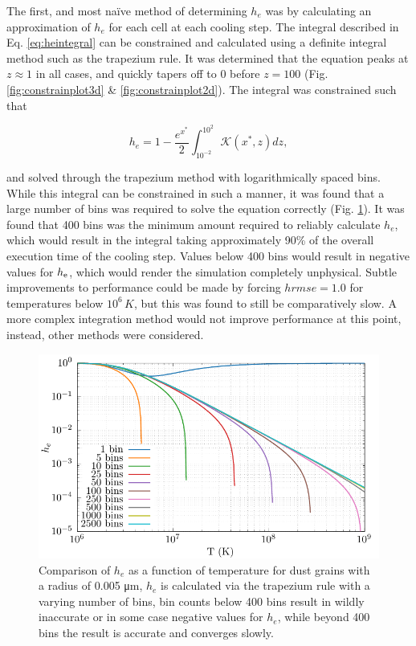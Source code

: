 The first, and most na\"ive method of determining $h_e$ was by calculating an approximation of $h_e$ for each cell at each cooling step.
The integral described in Eq. \ref{eq:heintegral} can be constrained and calculated using a definite integral method such as the trapezium rule.
It was determined that the equation peaks at $z \approx 1$ in all cases, and quickly tapers off to $0$ before $z=100$ (Fig. \ref{fig:constrainplot3d} \& \ref{fig:constrainplot2d}).
The integral was constrained such that

\begin{equation}
  h_e = 1 - \frac{e^{x^*}}{2} \int^{10^2}_{10^{-2}} \mathcal{K}(x^*,z) dz,
\end{equation}

\noindent
and solved through the trapezium method with logarithmically spaced bins.
While this integral can be constrained in such a manner, it was found that a large number of bins was required to solve the equation correctly (Fig. \ref{fig:he-accuracy-bins}).
It was found that 400 bins was the minimum amount required to reliably calculate $h_e$, which would result in the integral taking approximately 90\% of the overall execution time of the cooling step.
Values below 400 bins would result in negative values for $h_\text{e}$, which would render the simulation completely unphysical.
Subtle improvements to performance could be made by forcing $h
rms{e} = 1.0$ for temperatures below $10^6 \, \si{K}$, but this was found to still be comparatively slow.
A more complex integration method would not improve performance at this point, instead, other methods were considered.

\begin{figure}[ht]
  \centering
  \includegraphics{assets/he_accuracy/he_acc.pdf}
  \caption[$h_e$ integration accuracy comparison]{Comparison of $h_e$ as a function of temperature for dust grains with a radius of 0.005 \si{\micro\metre}, $h_e$ is calculated via the trapezium rule with a varying number of bins, bin counts below 400 bins result in wildly inaccurate or in some case negative values for $h_e$, while beyond 400 bins the result is accurate and converges slowly.}
  \label{fig:he-accuracy-bins}
\end{figure}

